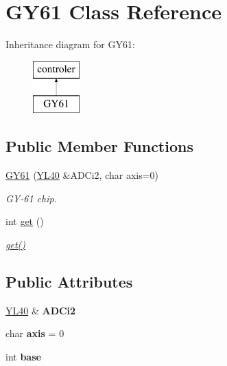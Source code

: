 \hypertarget{class_g_y61}{}\section{G\+Y61 Class Reference}
\label{class_g_y61}
Inheritance diagram for G\+Y61\+:\begin{figure}[H]
\begin{center}
\leavevmode
\includegraphics[height=2.000000cm]{class_g_y61}
\end{center}
\end{figure}
\subsection*{Public Member Functions}
\begin{DoxyCompactItemize}
\item 
\mbox{\hyperlink{class_g_y61_a18b9202457ceaa7187b2b85032970119}{G\+Y61}} (\mbox{\hyperlink{class_y_l40}{Y\+L40}} \&A\+D\+Ci2, char axis=0)
\begin{DoxyCompactList}\small\item\em G\+Y-\/61 chip. \end{DoxyCompactList}\item 
int \mbox{\hyperlink{class_g_y61_a3163809be7dd33dc0c46ba503b55394a}{get}} ()
\begin{DoxyCompactList}\small\item\em \mbox{\hyperlink{class_g_y61_a3163809be7dd33dc0c46ba503b55394a}{get()}} \end{DoxyCompactList}\end{DoxyCompactItemize}
\subsection*{Public Attributes}
\begin{DoxyCompactItemize}
\item 
\mbox{\label{class_g_y61_a40d6e29cc3b8a0701689f868cc82ee1f}} 
\mbox{\hyperlink{class_y_l40}{Y\+L40}} \& {\bfseries A\+D\+Ci2}
\item 
\mbox{\label{class_g_y61_a0f96ea841bdcf07771c613bf16be6bb9}} 
char {\bfseries axis} = 0
\item 
\mbox{\label{class_g_y61_adc2d00c3ffff2985240cad4808422e0b}} 
int {\bfseries base}
\end{DoxyCompactItemize}


